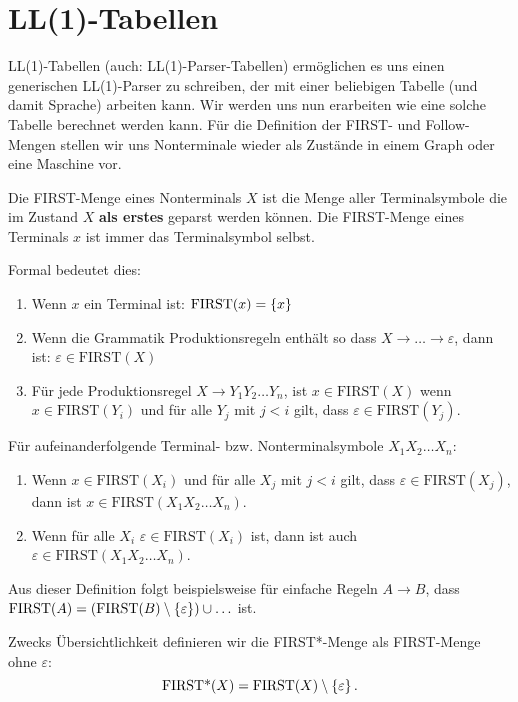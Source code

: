 \section{LL(1)-Tabellen}
LL(1)-Tabellen (auch: LL(1)-Parser-Tabellen) ermöglichen es uns einen generischen LL(1)-Parser zu schreiben, der mit
einer beliebigen Tabelle (und damit Sprache) arbeiten kann. Wir werden uns nun erarbeiten wie eine solche Tabelle berechnet werden kann.
Für die Definition der FIRST- und Follow-Mengen stellen wir uns Nonterminale wieder
als Zustände in einem Graph oder eine Maschine vor.
\begin{defn}
Die FIRST-Menge eines Nonterminals $X$ ist die Menge aller Terminalsymbole die im Zustand $X$ \textbf{als erstes} geparst werden können.
Die FIRST-Menge eines Terminals $x$ ist immer das Terminalsymbol selbst.

Formal bedeutet dies:
\begin{enumerate}
\item Wenn $x$ ein Terminal ist: $\text{FIRST}(x)=\left\{x\right\}$
\item Wenn die Grammatik Produktionsregeln enthält so dass $X \to \ldots \to \varepsilon$, dann ist: $\varepsilon \in \text{FIRST}(X)$
\item Für jede Produktionsregel $X \to Y_1 Y_2 \ldots Y_n$, ist $x \in \text{FIRST}(X)$ wenn $x \in \text{FIRST}(Y_i)$ und für alle
$Y_j$ mit $j < i$ gilt, dass $\varepsilon \in \text{FIRST}(Y_j)$.
\end{enumerate}
Für aufeinanderfolgende Terminal- bzw. Nonterminalsymbole $X_1 X_2 \ldots X_n$:
\begin{enumerate}
\item Wenn $x \in \text{FIRST}(X_i)$ und für alle $X_j$ mit $j < i$ gilt, dass $\varepsilon \in \text{FIRST}(X_j)$,
dann ist $x \in \text{FIRST}(X_1 X_2 \ldots X_n)$.
\item Wenn für alle $X_i$ $\varepsilon \in \text{FIRST}(X_i)$ ist, dann ist auch $\varepsilon \in \text{FIRST}(X_1 X_2 \ldots X_n)$.
\end{enumerate}
\end{defn}

Aus dieser Definition folgt beispielsweise für einfache Regeln $A \to B$, dass $\text{FIRST}(A) = \left(\text{FIRST}(B) \setminus \left\{\varepsilon\right\}\right)\cup \ldots$ ist.

\begin{defn}
Zwecks Übersichtlichkeit definieren wir die FIRST*-Menge als FIRST-Menge ohne $\varepsilon$:
\[\text{FIRST*}(X) = \text{FIRST}(X) \setminus \left\{\varepsilon\right\}.\]
\end{defn}

